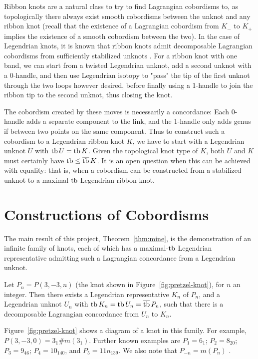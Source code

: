 Ribbon knots are a natural class to try to find Lagrangian cobordisms to, as topologically there always exist smooth cobordisms between the unknot and any ribbon knot (recall that the existence of  a Lagrangian cobordism from $K_-$ to $K_+$ implies the existence of a smooth cobordism between the two).
In the case of Legendrian knots, it is known that ribbon knots admit decomposable Lagrangian cobordisms from sufficiently stabilized unknots \cite{leverson-etnyre}.
For a ribbon knot with one band, we can start from a twisted Legendrian unknot, add a second unknot with a 0-handle, and then use Legendrian isotopy to "pass" the tip of the first unknot through the two loops however desired, before finally using a 1-handle to join the ribbon tip to the second unknot, thus closing the knot. 

The cobordism created by these moves is necessarily a concordance: Each 0-handle adds a separate component to the link, and the 1-handle only adds genus if between two points on the same component.
Thus to construct such a cobordism to a Legendrian ribbon knot $K$, we have to start with a Legendrian unknot $U$ with $\operatorname{tb} U = \operatorname{tb} K$. Given the topological knot type of $K$, both $U$ and $K$ must certainly have $\operatorname{tb} \leq \overline{\operatorname{tb}}\, K$.
It is an open question when this can be achieved with equality: that is, when a cobordism can be constructed from a stabilized unknot to a maximal-$\operatorname{tb}$ Legendrian ribbon knot.

\section{Constructions of Cobordisms}\label{sec:thm-a-proof}
The main result of this project, Theorem~\ref{thm:mine}, is the demonstration of an infinite family of knots, each of which has a maximal-$\operatorname{tb}$ Legendrian representative admitting such a Lagrangian concordance from a Legendrian unknot.

\begin{mythm}\label{thm:mine}
    Let $P_n = P(3, -3, n)$ (the knot shown in Figure~\ref{fig:pretzel-knot}), for $n$ an integer. Then there exists a Legendrian representative $K_n$ of $P_n$, and a Legendrian unknot $U_n$ with ${\operatorname{tb} K_n = \operatorname{tb} U_n = \overline{\operatorname{tb}}\, P_n}$, such that there is a decomposable Lagrangian concordance from $U_n$ to $K_n$.
\end{mythm}

Figure~\ref{fig:pretzel-knot} shows a diagram of a knot in this family.
For example, $P(3, -3, 0) = 3_1 \# m(3_1)$. Further known examples are $P_1 = 6_1$; $P_2 = 8_{20}$; $P_3 = 9_{46}$; $P_4 = 10_{140}$, and $P_5 = 11n_{139}$. We also note that $P_{-n} = m(P_n)$ \cite{kawauchi}.


